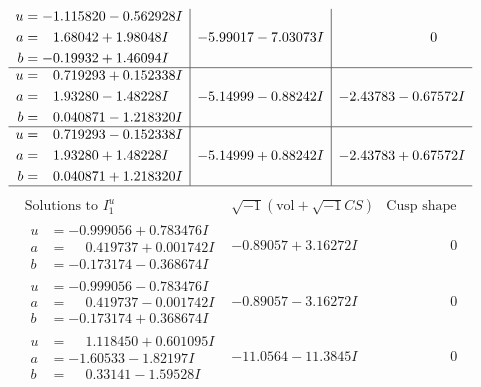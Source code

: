 \documentclass[1p]{elsarticle_modified}
\theoremstyle{definition}
\newcommand{\I}{\sqrt{-1}}
\begin{document}
$$\begin{array}{c|c|c}
\begin{aligned}
u &= -1.115820 - 0.562928 I \\
a &= \phantom{-}1.68042 + 1.98048 I \\
b &= -0.19932 + 1.46094 I\end{aligned}
 & -5.99017 - 7.03073 I & \phantom{-0.000000 } 0 \\ \hline\begin{aligned}
u &= \phantom{-}0.719293 + 0.152338 I \\
a &= \phantom{-}1.93280 - 1.48228 I \\
b &= \phantom{-}0.040871 - 1.218320 I\end{aligned}
 & -5.14999 - 0.88242 I & -2.43783 - 0.67572 I \\ \hline\begin{aligned}
u &= \phantom{-}0.719293 - 0.152338 I \\
a &= \phantom{-}1.93280 + 1.48228 I \\
b &= \phantom{-}0.040871 + 1.218320 I\end{aligned}
 & -5.14999 + 0.88242 I & -2.43783 + 0.67572 I\\
 \hline 
 \end{array}$$\newpage$$\begin{array}{c|c|c}  
\text{Solutions to }I^u_{1}& \I (\text{vol} + \sqrt{-1}CS) & \text{Cusp shape}\\
 \hline 
\begin{aligned}
u &= -0.999056 + 0.783476 I \\
a &= \phantom{-}0.419737 + 0.001742 I \\
b &= -0.173174 - 0.368674 I\end{aligned}
 & -0.89057 + 3.16272 I & \phantom{-0.000000 } 0 \\ \hline\begin{aligned}
u &= -0.999056 - 0.783476 I \\
a &= \phantom{-}0.419737 - 0.001742 I \\
b &= -0.173174 + 0.368674 I\end{aligned}
 & -0.89057 - 3.16272 I & \phantom{-0.000000 } 0 \\ \hline\begin{aligned}
u &= \phantom{-}1.118450 + 0.601095 I \\
a &= -1.60533 - 1.82197 I \\
b &= \phantom{-}0.33141 - 1.59528 I\end{aligned}
 & -11.0564 - 11.3845 I & \phantom{-0.000000 } 0 \\ \hline\begin{aligned}

\end{aligned}
\end{array}$$
\end{document}
